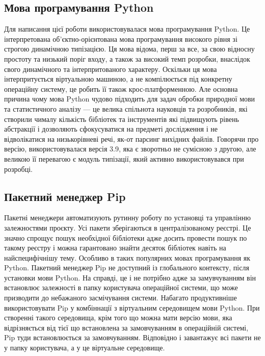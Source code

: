 \subsection{Мова програмування Python}
Для написання цієї роботи використовувалася мова програмування Python. Це інтерпретована
об'єктно-орієнтована мова програмування високого рівня зі строгою динамічною типізацією.
Ця мова відома, перш за все, за свою відносну простоту та низький поріг входу,
а також за високий темп розробки, внаслідок свого динамічного та інтерпритованого характеру.
Оскільки ця мова інтерпритується віртуальною машиною, а не компілюється під конкретну
операційну систему, це робить її також крос-платформенною.
Але основна причина чому мова Python чудово підходить для задач обробки природної мови
та статистичного аналізу --- це велика спільнота науковців та розробників, які створили чималу
кількість бібліотек та інструментів які підвищують рівень абстракції і дозволяють сфокусуватися
на предметі дослідження і не відволікатися на низькорівневі речі, як-от
парсинг вихідних файлів.
Говорячи про версію, використовувалася версія 3.9, яка є зворотньо не
сумісною з другою, але великою її перевагою є модуль типізації, який
активно використовувався при розробці.

\subsection{Пакетний менеджер Pip}
Пакетні менеджери автоматизують рутинну роботу по установці та управлінню
залежностями проєкту. Усі пакети зберігаються в централізованому
реєстрі. Це значно спрощує пошук необхідної бібліотеки адже досить провести
пошук по такому реєстру і можна гарантовано знайти десяток бібліотек навіть
на найспецифічнішу тему. Особливо в таких популярних мовах програмування як
Python. Пакетний менеджер Pip не доступний із глобального контексту, після
установки мови Python. На справді, це і не потрібно адже за замувчуванням
він встановлює залежності в папку користувача операційної системи, що може
призводити до небажаного засмічування системи. Набагато продуктивніше
використовувати Pip у комбіннації з віртуальним середовищем мови Python.
При створенні такого середовища, крім того що можна мати версію мови, яка
відрізняється від тієї що встановлена за замовчуванням в операційній системі,
Pip туди встановлюється за замовчуванням. Відповідно і завантажує
всі пакети не у папку користувача, а у це віртуальне середовище.

